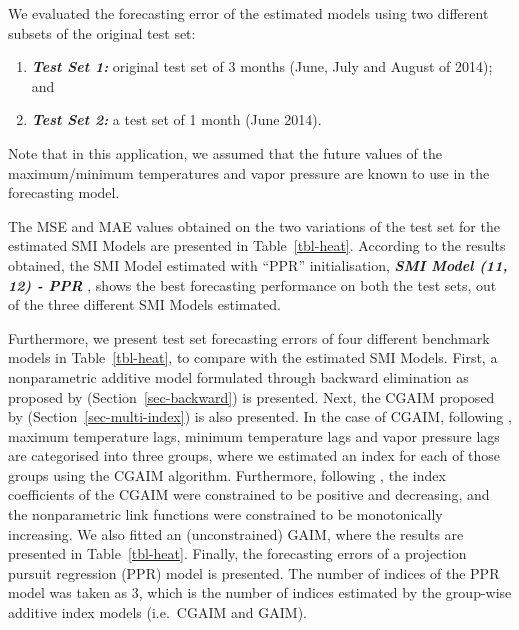 \documentclass[11pt,a4paper,]{article}
\providecommand{\tightlist}{%
  \setlength{\itemsep}{0pt}\setlength{\parskip}{0pt}}
\begin{document}
We evaluated the forecasting error of the estimated models using two
different subsets of the original test set:

\begin{enumerate}
\def\labelenumi{\arabic{enumi}.}
\tightlist
\item
  \textbf{\emph{Test Set 1:}} original test set of 3 months (June, July
  and August of 2014); and
\item
  \textbf{\emph{Test Set 2:}} a test set of 1 month (June 2014).
\end{enumerate}

Note that in this application, we assumed that the future values of the
maximum/minimum temperatures and vapor pressure are known to use in the
forecasting model.

The MSE and MAE values obtained on the two variations of the test set
for the estimated SMI Models are presented in Table~\ref{tbl-heat}.
According to the results obtained, the SMI Model estimated with ``PPR''
initialisation, \textbf{\emph{SMI Model (11, 12) - PPR }}, shows the
best forecasting performance on both the test sets, out of the three
different SMI Models estimated.

Furthermore, we present test set forecasting errors of four different
benchmark models in Table~\ref{tbl-heat}, to compare with the estimated
SMI Models. First, a nonparametric additive model formulated through
backward elimination as proposed by \textcite{FH2012}
(Section~\ref{sec-backward}) is presented. Next, the CGAIM proposed by
\textcite{Masselot2022} (Section~\ref{sec-multi-index}) is also
presented. In the case of CGAIM, following \textcite{Masselot2022},
maximum temperature lags, minimum temperature lags and vapor pressure
lags are categorised into three groups, where we estimated an index for
each of those groups using the CGAIM algorithm. Furthermore, following
\textcite{Masselot2022}, the index coefficients of the CGAIM were
constrained to be positive and decreasing, and the nonparametric link
functions were constrained to be monotonically increasing. We also
fitted an (unconstrained) GAIM, where the results are presented in
Table~\ref{tbl-heat}. Finally, the forecasting errors of a projection
pursuit regression (PPR) model is presented. The number of indices of
the PPR model was taken as 3, which is the number of indices estimated
by the group-wise additive index models (i.e.~CGAIM and GAIM).
\end{document}
